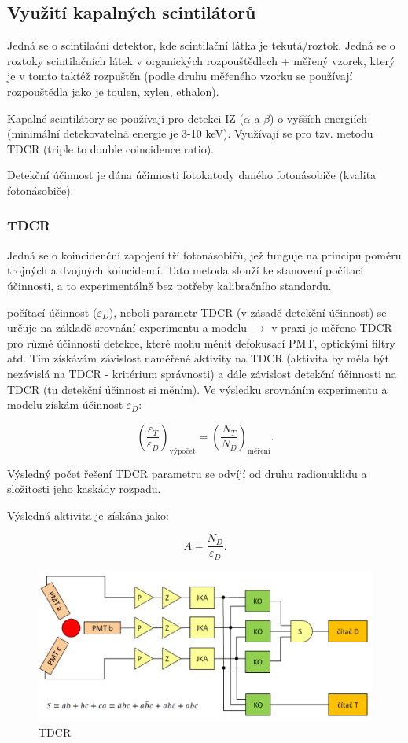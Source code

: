 \subsection{Využití kapalných scintilátorů}

Jedná se o scintilační detektor, kde scintilační látka je tekutá/roztok. Jedná se o roztoky scintilačních látek v organických rozpouštědlech + měřený vzorek, který je v tomto taktéž rozpuštěn (podle druhu měřeného vzorku se používají rozpouštědla jako je toulen, xylen, ethalon).

Kapalné scintilátory se používají pro detekci IZ ($\alpha$ a $\beta$) o vyšších energiích (minimální detekovatelná energie je 3-10 keV). Využívají se pro tzv. metodu TDCR (triple to double coincidence ratio).

Detekční účinnost je dána účinnosti fotokatody daného fotonásobiče (kvalita fotonásobiče).

\subsubsection{TDCR}

Jedná se o koincidenční zapojení tří fotonásobičů, jež funguje na principu poměru trojných a dvojných koincidencí. Tato metoda slouží ke stanovení počítací účinnosti, a to experimentálně bez potřeby kalibračního standardu.

počítací účinnost ($\varepsilon_D$), neboli parametr TDCR (v zásadě detekční účinnost) se určuje na základě srovnání experimentu a modelu $\rightarrow$ v praxi je měřeno TDCR pro různé účinnosti detekce, které mohu měnit defokusací PMT, optickými filtry atd. Tím získávám závislost naměřené aktivity na TDCR (aktivita by měla být nezávislá na TDCR - kritérium správnosti) a dále závislost detekční účinnosti na TDCR (tu detekční účinnost si měním). Ve výsledku srovnáním experimentu a modelu získám účinnost $\varepsilon_D$:

$$ \left( \frac{\varepsilon_T}{\varepsilon_D} \right)_\text{výpočet} = \left( \frac{N_T}{N_D} \right)_\text{měření}. $$

Výsledný počet řešení TDCR parametru se odvíjí od druhu radionuklidu a složitosti jeho kaskády rozpadu.

Výsledná aktivita je získána jako: 

$$ A = \frac{N_D}{\varepsilon_D}. $$

\begin{figure}[ht!]
    \centering
    \includegraphics[width=1\linewidth]{img/tdcr.png}
    \caption{TDCR}
\end{figure}
